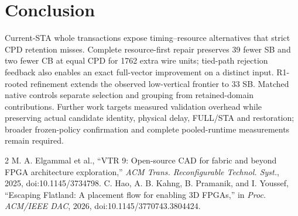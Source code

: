 \documentclass[conference,10pt]{IEEEtran}
\begin{document}
\section{Conclusion}
Current-STA whole transactions expose timing--resource alternatives that strict CPD retention misses. Complete resource-first repair preserves 39 fewer SB and two fewer CB at equal CPD for 1762 extra wire units; tied-path rejection feedback also enables an exact full-vector improvement on a distinct input. R1-rooted refinement extends the observed low-vertical frontier to 33 SB. Matched native controls separate selection and grouping from retained-domain contributions. Further work targets measured validation overhead while preserving actual candidate identity, physical delay, FULL/STA and restoration; broader frozen-policy confirmation and complete pooled-runtime measurements remain required.

\begin{thebibliography}{2}
 M. A. Elgammal et al., ``VTR 9: Open-source CAD for fabric and beyond FPGA architecture exploration,'' \emph{ACM Trans. Reconfigurable Technol. Syst.}, 2025, doi:10.1145/3734798.
 C. Hao, A. B. Kahng, B. Pramanik, and I. Youssef, ``Escaping Flatland: A placement flow for enabling 3D FPGAs,'' in \emph{Proc. ACM/IEEE DAC}, 2026, doi:10.1145/3770743.3804424.
\end{thebibliography}
\end{document}
